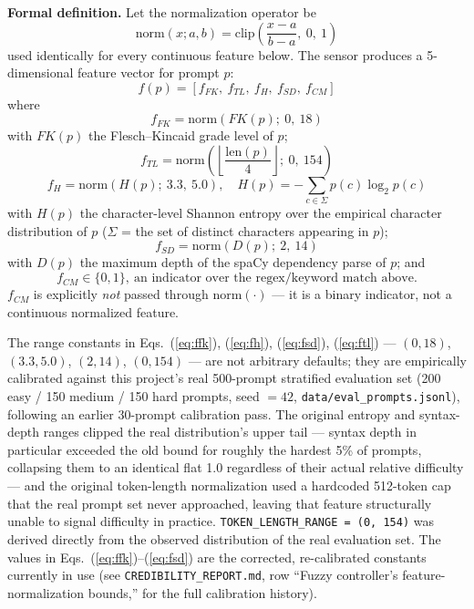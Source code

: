 \documentclass[conference]{IEEEtran}
\begin{document}
\textbf{Formal definition.} Let the normalization operator be
\begin{equation}
\text{norm}(x; a, b) = \mathrm{clip}\!\left(\frac{x - a}{b - a},\ 0,\ 1\right)
\label{eq:norm}
\end{equation}
used identically for every continuous feature below. The sensor produces
a 5-dimensional feature vector for prompt $p$:
\begin{equation}
f(p) = [f_{FK},\ f_{TL},\ f_{H},\ f_{SD},\ f_{CM}]
\label{eq:featurevec}
\end{equation}
where
\begin{equation}
f_{FK} = \text{norm}(FK(p);\ 0,\ 18)
\label{eq:ffk}
\end{equation}
with $FK(p)$ the Flesch--Kincaid grade level of $p$;
\begin{equation}
f_{TL} = \text{norm}\!\left(\left\lfloor \frac{\mathrm{len}(p)}{4} \right\rfloor;\ 0,\ 154\right)
\label{eq:ftl}
\end{equation}
\begin{equation}
f_{H} = \text{norm}(H(p);\ 3.3,\ 5.0),\quad H(p) = -\sum_{c \in \Sigma} p(c)\log_2 p(c)
\label{eq:fh}
\end{equation}
with $H(p)$ the character-level Shannon entropy over the empirical
character distribution of $p$ ($\Sigma$ = the set of distinct characters
appearing in $p$);
\begin{equation}
f_{SD} = \text{norm}(D(p);\ 2,\ 14)
\label{eq:fsd}
\end{equation}
with $D(p)$ the maximum depth of the spaCy dependency parse of $p$; and
\begin{equation}
f_{CM} \in \{0, 1\},\ \text{an indicator over the regex/keyword match above.}
\label{eq:fcm}
\end{equation}
$f_{CM}$ is explicitly \emph{not} passed through $\text{norm}(\cdot)$ ---
it is a binary indicator, not a continuous normalized feature.

The range constants in Eqs.~(\ref{eq:ffk}), (\ref{eq:fh}),
(\ref{eq:fsd}), (\ref{eq:ftl}) --- $(0,18)$, $(3.3,5.0)$, $(2,14)$,
$(0,154)$ --- are not arbitrary defaults; they are empirically calibrated
against this project's real 500-prompt stratified evaluation set (200
easy / 150 medium / 150 hard prompts, seed $=42$,
\texttt{data/eval\_prompts.jsonl}), following an earlier 30-prompt
calibration pass. The original entropy and syntax-depth ranges clipped
the real distribution's upper tail --- syntax depth in particular
exceeded the old bound for roughly the hardest 5\% of prompts, collapsing
them to an identical flat 1.0 regardless of their actual relative
difficulty --- and the original token-length normalization used a
hardcoded 512-token cap that the real prompt set never approached,
leaving that feature structurally unable to signal difficulty in
practice. \texttt{TOKEN\_LENGTH\_RANGE = (0, 154)} was derived directly
from the observed distribution of the real evaluation set. The values in
Eqs.~(\ref{eq:ffk})--(\ref{eq:fsd}) are the corrected, re-calibrated
constants currently in use (see \texttt{CREDIBILITY\_REPORT.md}, row
``Fuzzy controller's feature-normalization bounds,'' for the full
calibration history).
\end{document}
